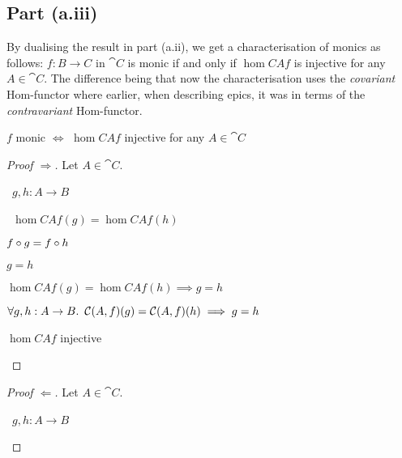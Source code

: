 \subsection{Part (a.iii)}\label{sec:q-1-a-iii}
By dualising the result in part (a.ii), we get a characterisation of monics as follows: $f : B\to C$ in $\cat{C}$ is monic if and only if $\hom{C}{A}{f}$ is injective for any $A\in\cat{C}$. The difference being that now the characterisation uses the \textit{covariant} Hom-functor where earlier, when describing epics, it was in terms of the \textit{contravariant} Hom-functor.

\begin{prop}
  $f$ monic $\iff$ $\hom{C}{A}{f}$ injective for any $A\in\cat{C}$

  \begin{proof}[Proof $\Rightarrow$]
    Let $A\in\cat{C}$.
    \begin{itemize}
      \step
        \begin{itemize}
          \subp{\star} \Let~$g, h : A\to B$
            \marginnote{\Hyp}

          \step
            \begin{itemize}
            \subp{\dagger}
              \Ass~$\hom{C}{A}{f}(g) = \hom{C}{A}{f}(h)$
              \marginnote{\Hyp}

            \step[\iffs] $f\compose g = f\compose h$
              \marginnote{\Def-\ref{def:co-hom}}

            \step[\imps] $g = h$
            \end{itemize}

          \step[\imps] $\hom{C}{A}{f}(g) = \hom{C}{A}{f}(h) \implies g = h$
            \marginnote{$\imps$-\Intro}
        \end{itemize}
      \step[\imps] $\forall g, h : A \to B\ldotp~\hom{C}{A}{f}(g) = \hom{C}{A}{f}(h) \implies g = h$
        \marginnote{$\forall$-\Intro}

      \step[\iffs] $\hom{C}{A}{f}$ injective
        \qedhere
    \end{itemize}
  \end{proof}

  \begin{proof}[Proof $\Leftarrow$]
    Let $A\in\cat{C}$.
    \begin{itemize}
      \step
        \begin{itemize}
          \subp{\star} \Let~$g, h : A\to B$
            \marginnote{\Hyp}


\end{itemize}
\end{itemize}
\end{proof}
\end{prop}
